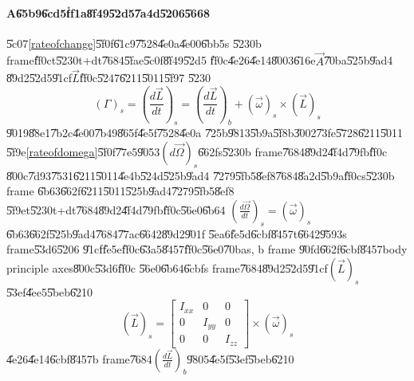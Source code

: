 \documentclass[12pt,a4paper]{article}
\begin{document}
\bigskip

\paragraph{A\U{65b9}\U{6cd5}\U{ff1a}\U{8f49}\U{52d5}\U{7a4d}\U{5206}\U{5668}}

\U{5c07}\ref{rateofchange}\U{5f0f}\U{61c9}\U{7528}\U{4e0a}\U{4e00}\U{6bb5}s%
\U{5230}b frame\U{ff0c}t\U{5230}t+dt\U{7684}\U{5fae}\U{5c0f}\U{8f49}\U{52d5}%
\U{ff0c}\U{4e26}\U{4e14}\U{8003}\U{616e}$\vec{A}$\U{70ba}\U{525b}\U{9ad4}%
\U{89d2}\U{52d5}\U{91cf}$\vec{L}$\U{ff0c}\U{5247}\U{6211}\U{5011}\U{5f97}%
\U{5230}%
\begin{equation}
\left( \Gamma \right) _{s}=\left( \frac{d\vec{L}}{dt}\right) _{s}=\left( 
\frac{d\vec{L}}{dt}\right) _{b}+\left( \vec{\omega}\right) _{s}\times \left( 
\vec{L}\right) _{s}  \label{liw}
\end{equation}%
\U{9019}\U{88e1}\U{7b2c}\U{4e00}\U{7b49}\U{865f}\U{4e5f}\U{7528}\U{4e0a}%
\U{725b}\U{9813}\U{5b9a}\U{5f8b}\U{3002}\U{73fe}\U{5728}\U{6211}\U{5011}%
\U{5f9e}\ref{rateofdomega}\U{5f0f}\U{77e5}\U{9053}$\left( d\vec{\Omega}%
\right) _{s}$\U{662f}s\U{5230}b frame\U{7684}\U{89d2}\U{4f4d}\U{79fb}\U{ff0c}%
\U{800c}\U{7d93}\U{7531}\U{6211}\U{5011}\U{4e4b}\U{524d}\U{525b}\U{9ad4}%
\U{7279}\U{5fb5}\U{8ef8}\U{7684}\U{8a2d}\U{5b9a}\U{ff0c}s\U{5230}b frame%
\U{6b63}\U{662f}\U{6211}\U{5011}\U{525b}\U{9ad4}\U{7279}\U{5fb5}\U{8ef8}%
\U{5f9e}t\U{5230}t+dt\U{7684}\U{89d2}\U{4f4d}\U{79fb}\U{ff0c}\U{56e0}\U{6b64}%
$\left( \frac{d\vec{\Omega}}{dt}\right) _{s}=\left( \vec{\omega}\right) _{s}$%
\U{6b63}\U{662f}\U{525b}\U{9ad4}\U{7684}\U{77ac}\U{6642}\U{89d2}\U{901f}%
\U{5ea6}\U{fe5d}\U{6cbf}\U{8457}t\U{6642}\U{9593}s frame\U{53d6}\U{5206}%
\U{91cf}\U{fe5e}\U{ff0c}\U{63a5}\U{8457}\U{ff0c}\U{56e0}\U{70ba}s, b frame%
\U{90fd}\U{662f}\U{6cbf}\U{8457}body principle axes\U{800c}\U{53d6}\U{ff0c}%
\U{56e0}\U{6b64}\U{6cbf}s frame\U{7684}\U{89d2}\U{52d5}\U{91cf}$\left( \vec{L%
}\right) _{s}$\U{53ef}\U{4ee5}\U{5beb}\U{6210}%
\begin{equation*}
\left( \vec{L}\right) _{s}=\left[ 
\begin{array}{ccc}
I_{xx} & 0 & 0 \\ 
0 & I_{yy} & 0 \\ 
0 & 0 & I_{zz}%
\end{array}%
\right] \times \left( \vec{\omega}\right) _{s}
\end{equation*}%
\U{4e26}\U{4e14}\U{6cbf}\U{8457}b frame\U{7684}$\left( \frac{d\vec{L}}{dt}%
\right) _{b}$\U{9805}\U{4e5f}\U{53ef}\U{5beb}\U{6210}%
\end{document}
